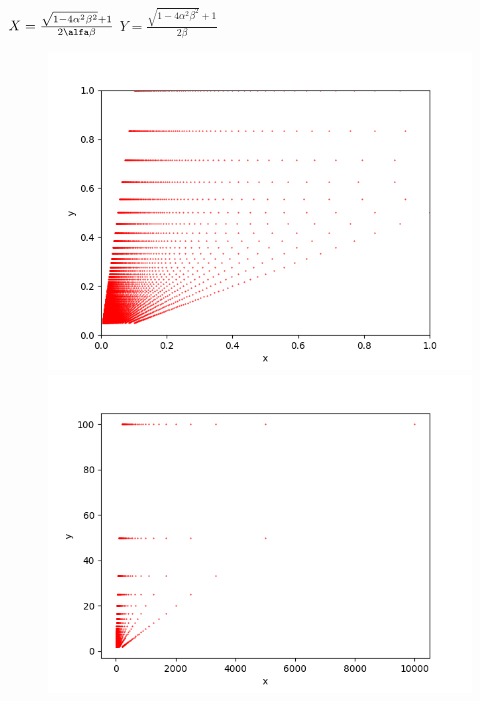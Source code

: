 \documentclass{article}
\begin{document}
    \begin{center}
        $X = \frac{\sqrt{1-4\alpha^2 \beta^2} + 1 }{2\alfa\beta}$\hspace{0.5cm}
        $Y = \frac{\sqrt{1-4\alpha^2 \beta^2} + 1 }{2\beta}$
    \end{center}

    \begin{figure}[ht]
        \centering
        \begin{minipage}{.5\textwidth}
            \centering
            \includegraphics[width=\linewidth]{dodatnieNN}
        \end{minipage}%
        \begin{minipage}{.5\textwidth}
            \centering
            \includegraphics[width=\linewidth]{dodatnieNNN}
        \end{minipage}%
    \end{figure}
\end{document}
